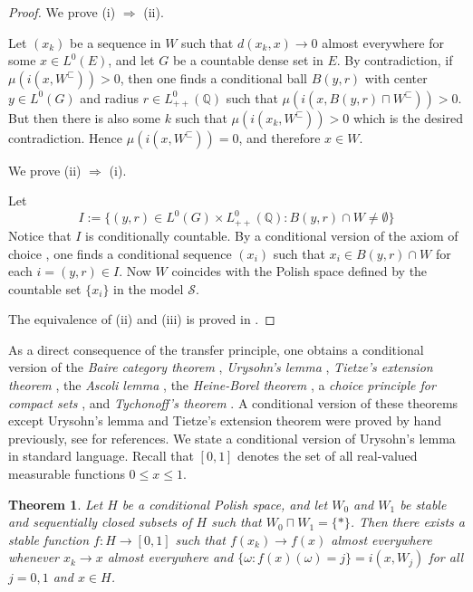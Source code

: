 \documentclass{jloganal}
\numberwithin{equation}{section}
\theoremstyle{plain}
\newtheorem{theorem}[subsection]{Theorem}
\renewcommand{\leq}{\leqslant}
\begin{document}
\begin{proof}
We prove (i) $\Rightarrow$ (ii). 

Let $(x_k)$ be a sequence in $W$ such that $d(x_k,x)\to 0$ almost everywhere for some $x\in L^0(E)$, and let $G$ be a countable dense set in $E$. 
By contradiction, if $\mu(i(x,W^\sqsubset))>0$, then one finds a conditional ball $B(y,r)$ with center $y\in L^0(G)$ and radius $r\in L^0_{++}(\mathbb{Q})$  such that $\mu(i(x,B(y,r)\sqcap W^\sqsubset))>0$. 
But then there is also some $k$ such that $\mu(i(x_k,W^\sqsubset))>0$ which is the desired contradiction. 
Hence $\mu(i(x,W^\sqsubset))=0$, and therefore $x\in W$.   

We prove (ii) $\Rightarrow$ (i).  

Let 
\[
I:=\{(y,r)\in L^0(G)\times L^0_{++}(\mathbb{Q})\colon B(y,r)\cap W\neq \emptyset\}
\]
Notice that $I$ is conditionally countable.  
By a conditional version of the axiom of choice \cite[Theorem 2.26]{drapeau2016algebra}, one finds a conditional sequence $(x_i)$ such that $x_i\in B(y,r)\cap W$ for each $i=(y,r)\in I$.    
Now $W$ coincides with the Polish space defined by the countable set $\{x_i\}$ in the model $\mathcal{S}$.  

The equivalence of (ii) and (iii) is proved in \cite[Section 5]{jamneshan2017compact}. 
\end{proof} 
As a direct consequence of the transfer principle, one obtains a conditional version of the \emph{Baire category theorem} \cite[Theorem II.5.8]{simpson2009subsystems}, \emph{Urysohn's lemma} \cite[Lemma II.7.3]{simpson2009subsystems}, \emph{Tietze's extension theorem} \cite[Theorem II.7.5]{simpson2009subsystems}, the \emph{Ascoli lemma} \cite[Theorem III.2.8]{simpson2009subsystems},  the \emph{Heine-Borel theorem}  \cite[Theorem IV.1.5]{simpson2009subsystems}, a \emph{choice principle for compact sets} \cite[Theorem IV.1.8]{simpson2009subsystems}, and \emph{Tychonoff's theorem}  \cite[Theorem III.2.5]{simpson2009subsystems}.    
A conditional version of these theorems except Urysohn's lemma and Tietze's extension theorem were proved by hand previously, see \cite{jamneshan2017compact} for references. 
We state a conditional version of Urysohn's lemma in standard language. 
Recall that $[0,1]$ denotes the set of all real-valued measurable functions $0\leq x\leq 1$. 
\begin{theorem}
Let $H$ be a conditional Polish space, and let $W_0$ and $W_1$ be stable and sequentially closed subsets of $H$ such that $W_0\sqcap W_1=\{\ast\}$.   
Then there exists a stable function $f\colon H\to [0,1]$ such that $f(x_k)
\to f(x)$ almost everywhere whenever $x_k\to x$ almost everywhere and $\{\omega\colon f(x)(\omega)=j\}=i(x,W_j)$ for all $j=0,1$ and $x\in H$. 
\end{theorem}
\end{document}
